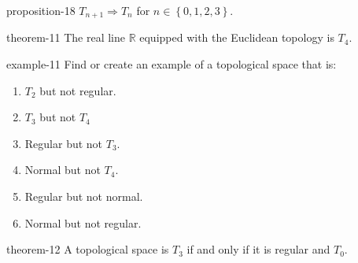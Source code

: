 \documentclass[10pt,]{article}
\newcommand{\mb}{\mathbb}
\newcommand{\setList}[1]{\left\{#1\right\}}
\begin{document}
\begin{proposition}{}{}{proposition-18}%
\hypertarget{p-84}{}%
\(T_{n+1}\Rightarrow T_n\) for \(n\in\setList{0,1,2,3}\).%
\end{proposition}
\begin{theorem}{}{}{theorem-11}%
\hypertarget{p-85}{}%
The real line \(\mb R\) equipped with the Euclidean topology is \(T_4\).%
\end{theorem}
\begin{example}{}{example-11}%
\hypertarget{p-86}{}%
Find or create an example of a topological space that is:%
\leavevmode%
\begin{enumerate}
\item\hypertarget{li-74}{}\(T_2\) but not regular.%
\item\hypertarget{li-75}{}\(T_3\) but not \(T_4\)%
\item\hypertarget{li-76}{}Regular but not \(T_3\).%
\item\hypertarget{li-77}{}Normal but not \(T_4\).%
\item\hypertarget{li-78}{}Regular but not normal.%
\item\hypertarget{li-79}{}Normal but not regular.%
\end{enumerate}
\end{example}
\begin{theorem}{}{}{theorem-12}%
\hypertarget{p-87}{}%
A topological space is \(T_3\) if and only if it is regular and \(T_0\).%
\end{theorem}
%
%
\typeout{************************************************}
\typeout{************************************************}
%
\end{document}
